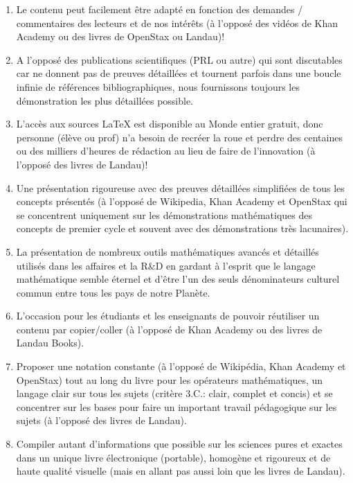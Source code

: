 \begin{enumerate}
		\item Le contenu peut facilement être adapté en fonction des demandes / commentaires des lecteurs et de nos intérêts (à l'opposé des vidéos de Khan Academy ou des livres de OpenStax ou Landau)!
		
		\item A l'opposé des publications scientifiques (PRL ou autre) qui sont discutables car ne donnent pas de preuves détaillées et tournent parfois dans une boucle infinie de références bibliographiques, nous fournissons toujours les démonstration les plus détaillées possible.
		
		\item L'accès aux sources \LaTeX{} est disponible au Monde entier gratuit, donc personne (élève ou prof) n'a besoin de recréer la roue et perdre des centaines ou des milliers d'heures de rédaction au lieu de faire de l'innovation (à l'opposé des livres de Landau)!

		\item Une présentation rigoureuse avec des preuves détaillées simplifiées de tous les concepts présentés (à l'opposé de Wikipedia, Khan Academy et OpenStax qui se concentrent uniquement sur les démonstrations mathématiques des concepts de premier cycle et souvent avec des démonstrations très lacunaires).

		\item La présentation de nombreux outils mathématiques avancés et détaillés utilisés dans les affaires et la R\&D en gardant à l'esprit que le langage mathématique semble éternel et d'être l'un des seuls dénominateurs culturel commun entre tous les pays de notre Planète.

		\item L'occasion pour les étudiants et les enseignants de pouvoir réutiliser un contenu par copier/coller (à l'opposé de Khan Academy ou des livres de Landau Books).

		\item Proposer une notation constante (à l'opposé de Wikipédia, Khan Academy et OpenStax) tout au long du livre pour les opérateurs mathématiques, un langage clair sur tous les sujets (critère 3.C.: clair, complet et concis) et se concentrer sur les bases pour faire un important travail pédagogique sur les sujets (à l'opposé des livres de Landau).

		\item Compiler autant d'informations que possible sur les sciences pures et exactes dans un unique livre électronique (portable), homogène et rigoureux et de haute qualité visuelle (mais en allant pas aussi loin que les livres de Landau).


\end{enumerate}
